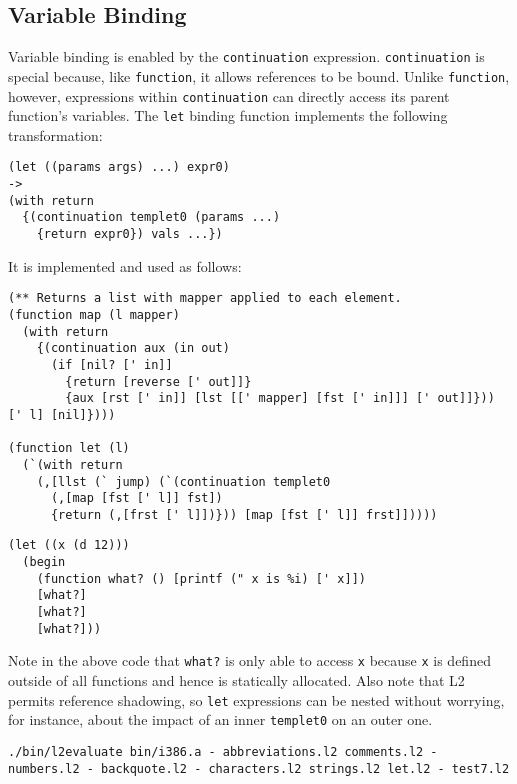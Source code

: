\documentclass[twocolumn,landscape]{article}
\begin{document}
    \subsection{Variable Binding}\label{sec:variable-binding}
      Variable binding is enabled by the \lstinline{continuation} expression. \lstinline{continuation} is special because, like \lstinline{function}, it allows references to be bound. Unlike \lstinline{function}, however, expressions within \lstinline{continuation} can directly access its parent function's variables. The \lstinline{let} binding function implements the following transformation:
      \begin{lstlisting}
(let ((params args) ...) expr0)
->
(with return
  {(continuation templet0 (params ...)
    {return expr0}) vals ...})
      \end{lstlisting}
      It is implemented and used as follows:
      \begin{lstlisting}[caption={let.l2}]
(** Returns a list with mapper applied to each element.
(function map (l mapper)
  (with return
    {(continuation aux (in out)
      (if [nil? [' in]]
        {return [reverse [' out]]}
        {aux [rst [' in]] [lst [[' mapper] [fst [' in]]] [' out]]})) [' l] [nil]})))

(function let (l)
  (`(with return
    (,[llst (` jump) (`(continuation templet0
      (,[map [fst [' l]] fst])
      {return (,[frst [' l]])})) [map [fst [' l]] frst]]))))
      \end{lstlisting}
      
      \begin{lstlisting}[caption={test7.l2}]
(let ((x (d 12)))
  (begin
    (function what? () [printf (" x is %i) [' x]])
    [what?]
    [what?]
    [what?]))
      \end{lstlisting}
      Note in the above code that \lstinline{what?} is only able to access \lstinline{x} because \lstinline{x} is defined outside of all functions and hence is statically allocated. Also note that L2 permits reference shadowing, so \lstinline{let} expressions can be nested without worrying, for instance, about the impact of an inner \lstinline{templet0} on an outer one.

      \begin{lstlisting}[caption={shell}]
./bin/l2evaluate bin/i386.a - abbreviations.l2 comments.l2 - numbers.l2 - backquote.l2 - characters.l2 strings.l2 let.l2 - test7.l2
      \end{lstlisting}
\end{document}
